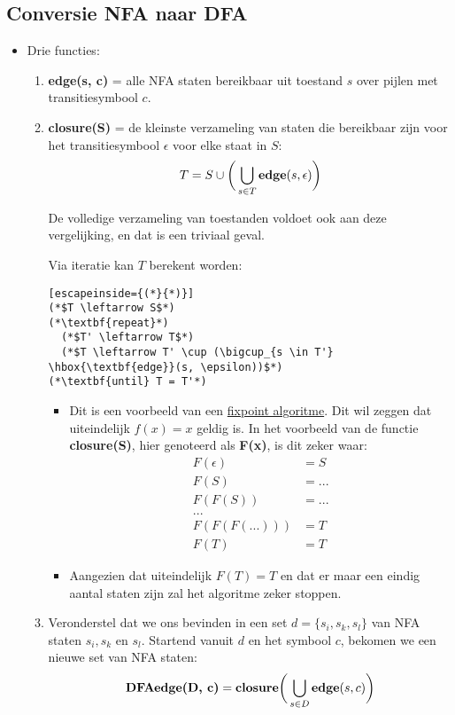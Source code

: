 \subsection{Conversie NFA naar DFA}
\begin{itemize}
	\item Drie functies:
	\begin{enumerate}
		\item \textbf{edge(s, c)} = alle NFA staten bereikbaar uit toestand $s$ over pijlen met transitiesymbool $c$.
		\item \textbf{closure(S)} = de kleinste verzameling van staten die bereikbaar zijn voor het transitiesymbool $\epsilon$ voor elke staat in $S$:
		$$
		T = S \cup \bigg(\bigcup_{s \in T} \hbox{\textbf{edge}}(s, \epsilon)\bigg)
		$$
		
		{De volledige verzameling van toestanden voldoet ook aan deze vergelijking, en dat is een triviaal geval.}
		
		Via iteratie kan $T$ berekent worden:
			\begin{lstlisting}[escapeinside={(*}{*)}]
(*$T \leftarrow S$*)
(*\textbf{repeat}*)
  (*$T' \leftarrow T$*)
  (*$T \leftarrow T' \cup (\bigcup_{s \in T'} \hbox{\textbf{edge}}(s, \epsilon))$*)
(*\textbf{until} T = T'*)
			\end{lstlisting}
			
		\begin{itemize}
			\item Dit is een voorbeeld van een \underline{fixpoint algoritme}. Dit wil zeggen dat uiteindelijk $f(x) = x$ geldig is. In het voorbeeld van de functie \textbf{closure(S)}, hier genoteerd als \textbf{F(x)}, is dit zeker waar:
			\begin{equation*}
				\begin{split}
					F(\epsilon) & = S \\
					F(S) & = ... \\
					F(F(S)) & = ...\\
					...\\
					F(F(F(...))) & = T \\
					F(T) & = T
				\end{split}
			\end{equation*}
			\item Aangezien dat uiteindelijk $F(T) = T$ en dat er maar een eindig aantal staten zijn zal het algoritme zeker stoppen.
		\end{itemize}
	
		\item Veronderstel dat we ons bevinden in een set $d = \{s_i, s_k, s_l\}$ van NFA staten $s_i, s_k$ en $s_l$. Startend vanuit $d$ en het symbool $c$, bekomen we een nieuwe set van NFA staten:
		$$\hbox{\textbf{DFAedge(D, c)}} = \hbox{\textbf{closure}}\bigg(\bigcup_{s \in D} \hbox{\textbf{edge}}(s, c)\bigg)$$
		

\end{enumerate}
\end{itemize}
